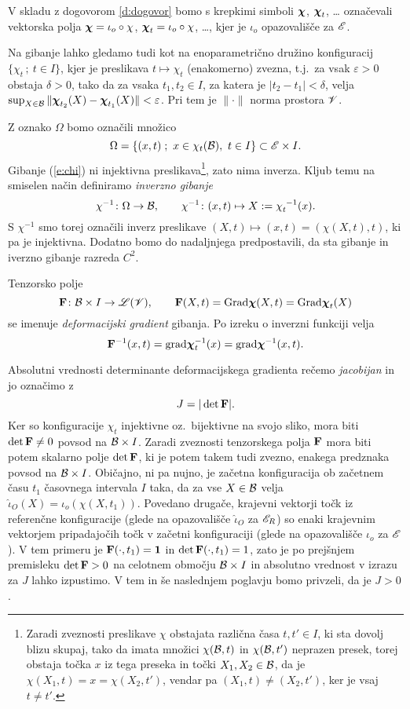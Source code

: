 V skladu z dogovorom \ref{d:dogovor} bomo s krepkimi simboli $\boldsymbol \chi$, $\boldsymbol \chi_t$, \dots
označevali vektorska polja $\boldsymbol \chi=\iota_o\circ\chi$, $\boldsymbol \chi_t=\iota_o\circ\chi$, \dots,
kjer je $\iota_o$ opazovališče za $\mathscr E$.

Na gibanje lahko gledamo tudi kot na enoparametrično družino konfiguracij
$\{ \chi_t\,;\ t\in I \}$, kjer je preslikava $t\mapsto\chi_t$ (enakomerno) zvezna,
t.j.~za vsak $\varepsilon>0$ obstaja $\delta>0$, tako da za vsaka $t_1,t_2\in I$,
za katera je $|t_2-t_1|<\delta$, velja $\sup_{X\in\mathcal B}\|\boldsymbol \chi_{t_2}(X)-\boldsymbol \chi_{t_1}(X)\|<\varepsilon$.
Pri tem je $\|\cdot\|$ norma prostora $\mathscr V$.

Z oznako $\Omega$ bomo označili množico
\[ \Omega=\{(x,t)\;;\ x\in\chi_t(\B),\ t\in I\}\subset\E\times I. \]
Gibanje (\ref{e:chi}) ni injektivna preslikava\footnote{Zaradi zveznosti preslikave $\chi$
obstajata različna časa $t,t'\in I$, ki sta dovolj blizu skupaj, tako da imata množici $\chi(\mathcal B,t)$
in $\chi(\mathcal B,t')$ neprazen presek, torej obstaja točka $x$ iz tega preseka in točki $X_1,X_2\in\mathcal B$,
da je $\chi(X_1,t)=x=\chi(X_2,t')$, vendar pa $(X_1,t)\neq(X_2,t')$, ker je vsaj $t\neq t'$.},
zato nima inverza. Kljub temu na smiselen način definiramo \emph{inverzno gibanje}
\[
	\chi^{-1}\colon\Omega\to \B,\qquad
	\chi^{-1}\colon(x,t)\mapsto X:=\bottop{\chi}{t}{-1}(x).
\]
S $\chi^{-1}$ smo torej označili inverz preslikave $(X,t)\mapsto(x,t)=(\chi(X,t),t)$,
ki pa je injektivna.
Dodatno bomo do nadaljnjega predpostavili, da sta gibanje in iverzno gibanje razreda $C^2$.

Tenzorsko polje
\[
	\mathbf F\colon \mathcal B\times I\to\mathscr L(\mathscr V),\qquad \mathbf F(X,t)=\mathrm{Grad}\boldsymbol \chi(X,t)=\mathrm{Grad}\boldsymbol \chi_t(X)
\]
se imenuje \emph{deformacijski gradient} gibanja. Po izreku o inverzni funkciji velja
\[
	\mathbf F^{-1}(x,t)=\mathrm{grad}\boldsymbol \chi_t^{-1}(x)=\mathrm{grad}\boldsymbol \chi^{-1}(x,t).
\]

Absolutni vrednosti determinante deformacijskega gradienta rečemo \emph{jacobijan} in jo označimo z
\[
	J=|\det\mathbf F|.
\]
Ker so konfiguracije $\chi_t$
injektivne oz.~bijektivne na svojo sliko, mora biti $\det\mathbf F\neq 0$ povsod na $\mathcal B\times I$.
Zaradi zveznosti tenzorskega polja $\mathbf F$ mora biti potem skalarno polje $\det\mathbf F$,
ki je potem takem tudi zvezno, enakega predznaka povsod na $\mathcal B\times I$.
Običajno, ni pa nujno, je začetna konfiguracija ob začetnem času $t_1$ časovnega intervala $I$
taka, da za vse $X\in\mathcal B$ velja $\hat{\iota}_{O}(X)=\iota_o(\chi(X,t_1))$. Povedano drugače,
krajevni vektorji točk iz referenčne konfiguracije (glede na opazovališče $\hat{\iota}_{O}$ za $\mathscr E_R$)
so enaki krajevnim vektorjem pripadajočih točk v začetni konfiguraciji (glede na opazovališče $\iota_o$ za $\mathscr E$).
V tem primeru je $\mathbf F(\cdot,t_1)=\mathbf 1$ in $\det\mathbf F(\cdot,t_1)=1$, zato je po prejšnjem
premisleku $\det\mathbf F>0$ na celotnem območju $\mathcal B\times I$ in absolutno vrednost v izrazu za $J$
lahko izpustimo. V tem in še naslednjem poglavju bomo privzeli, da je $J>0$.

